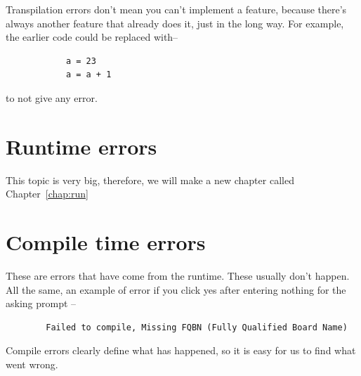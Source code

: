	\begin{notebox}
		Transpilation errors don't mean you can't implement a feature, because there's always another feature that already does it, just in the long way. For example, the earlier code could be replaced with--
		\begin{lstlisting}
			a = 23
			a = a + 1
		\end{lstlisting}
		to not give any error.
	\end{notebox}
	
	\section{Runtime errors}
	This topic is very big, therefore, we will make a new chapter called Chapter~\ref{chap:run}
	
	\section{Compile time errors}
	These are errors that have come from the  runtime. These usually don't happen. All the same, an example of error if you click yes after entering nothing for the  asking prompt -- 
	\begin{lstlisting}
		Failed to compile, Missing FQBN (Fully Qualified Board Name)
	\end{lstlisting}
	\begin{tipbox}
		Compile errors clearly define what has happened, so it is easy for us to find what went wrong.
	\end{tipbox}